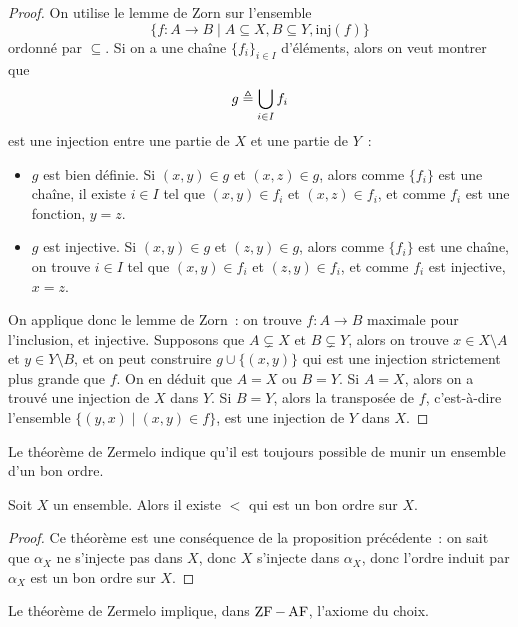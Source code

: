 \begin{proof}
  On utilise le lemme de Zorn sur l'ensemble
  \[\{f : A \to B \mid A \subseteq X, B \subseteq Y, \mathrm{inj}(f)\}\]
  ordonné par $\subseteq$. Si on a une chaîne $\{f_i\}_{i\in I}$ d'éléments,
  alors on veut montrer que
  \[g\triangleq \bigcup_{i\in I} f_i\]
  est une injection entre une partie de $X$ et une partie de $Y$~:
  \begin{itemize}
  \item $g$ est bien définie. Si $(x,y)\in g$ et $(x,z)\in g$, alors comme
    $\{f_i\}$ est une chaîne, il existe $i\in I$ tel que $(x,y)\in f_i$ et
    $(x,z)\in f_i$, et comme $f_i$ est une fonction, $y=z$.
  \item $g$ est injective. Si $(x,y)\in g$ et $(z,y)\in g$, alors comme
    $\{f_i\}$ est une chaîne, on trouve $i\in I$ tel que $(x,y)\in f_i$ et
    $(z,y)\in f_i$, et comme $f_i$ est injective, $x=z$.
  \end{itemize}

  On applique donc le lemme de Zorn~: on trouve $f : A \to B$ maximale pour
  l'inclusion, et injective. Supposons que $A\subsetneq X$ et $B\subsetneq Y$,
  alors on trouve $x\in X\setminus A$ et $y\in Y\setminus B$, et on peut
  construire $g\cup\{(x,y)\}$ qui est une injection strictement plus grande
  que $f$. On en déduit que $A = X$ ou $B = Y$. Si $A = X$, alors on a trouvé
  une injection de $X$ dans $Y$. Si $B = Y$, alors la transposée de $f$,
  c'est-à-dire l'ensemble $\{(y,x)\mid (x,y)\in f\}$, est une injection de
  $Y$ dans $X$.
\end{proof}

Le théorème de Zermelo indique qu'il est toujours possible de munir un ensemble
d'un bon ordre.

\begin{theorem}\label{thm.Zermelo}
  Soit $X$ un ensemble. Alors il existe $<$ qui est un bon ordre sur $X$.
\end{theorem}

\begin{proof}
  Ce théorème est une conséquence de la proposition précédente~: on sait que
  $\alpha_X$ ne s'injecte pas dans $X$, donc $X$ s'injecte dans $\alpha_X$,
  donc l'ordre induit par $\alpha_X$ est un bon ordre sur $X$.
\end{proof}

\begin{property}
  Le théorème de Zermelo implique, dans $\operatorname{ZF} - \operatorname{AF}$, l'axiome du choix.
\end{property}

